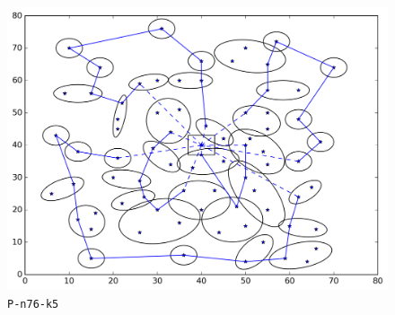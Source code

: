 \documentclass[11pt]{beamer}
\begin{document}
\begin{frame}
\begin{columns}[t,onlytextwidth]
\begin{figure}
\centering
\includegraphics[width=\linewidth]{Images/P-n76-k5-c38_flow_n76_k39_m5_Q280_TL480_map.png}
\caption{\texttt{P-n76-k5}}
\end{figure}

\end{columns}
\end{frame}
\end{document}
